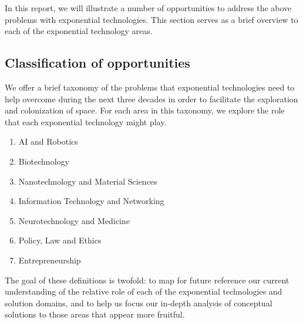 \documentclass[letter,11pt]{article}
\begin{document}
In this report, we will illustrate a number of opportunities to address the
above problems with exponential technologies. This section serves as a brief
overview to each of the exponential technology areas.



\subsection{Classification of opportunities}

We offer a brief taxonomy of the problems that exponential technologies need to
help overcome during the next three decades in order to facilitate the
exploration and colonization of space. For each area in this taxonomy, we
explore the role that each exponential technology might play.

\begin{enumerate}
	\item AI and Robotics \item   Biotechnology \item  Nanotechnology and Material Sciences \item  Information Technology and Networking \item  Neurotechnology and Medicine \item  Policy, Law and Ethics \item Entrepreneurship 
\end{enumerate}

The goal of these definitions is twofold: to map for future reference
our current understanding of the relative role of each of the
exponential technologies and solution domains, and to help us focus our
in-depth analysis of conceptual solutions to those areas that appear
more fruitful.
\end{document}
